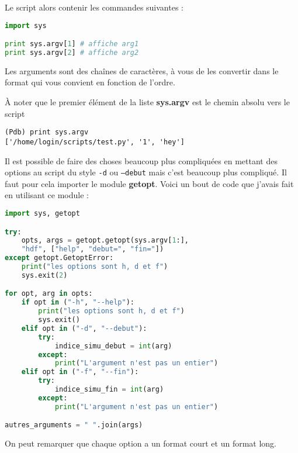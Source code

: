 \documentclass[a4paper,twoside]{article}
\begin{document}
Le script alors contenir les commandes suivantes :
\begin{lstlisting}[language=python]
import sys

print sys.argv[1] # affiche arg1
print sys.argv[2] # affiche arg2
\end{lstlisting}
Les arguments sont des chaînes de caractères, à vous de les convertir dans le format qui vous convient en fonction de l'ordre.

\begin{remarque}
À noter que le premier élément de la liste \textbf{sys.argv} est le chemin absolu vers le script
\begin{verbatim}
(Pdb) print sys.argv
['/home/login/scripts/test.py', '1', 'hey']
\end{verbatim}
\end{remarque}

\bigskip

Il est possible de faire des choses beaucoup plus compliquées en mettant des options au script du style \texttt{-d} ou \texttt{--debut} mais c'est beaucoup plus compliqué. Il faut pour cela importer le module \textbf{getopt}. Voici un bout de code que j'avais fait en utilisant ce module : 
\begin{lstlisting}[language=python]
import sys, getopt

try:                                
    opts, args = getopt.getopt(sys.argv[1:], 
    "hdf", ["help", "debut=", "fin="])
except getopt.GetoptError:          
    print("les options sont h, d et f")                        
    sys.exit(2)

for opt, arg in opts:                
    if opt in ("-h", "--help"):      
        print("les options sont h, d et f")                    
        sys.exit()                  
    elif opt in ("-d", "--debut"):
        try:
            indice_simu_debut = int(arg)
        except:
            print("L'argument n'est pas un entier")
    elif opt in ("-f", "--fin"): 
        try:
            indice_simu_fin = int(arg)
        except:
            print("L'argument n'est pas un entier")

autres_arguments = " ".join(args)
\end{lstlisting}
On peut remarquer que chaque option a un format court et un format long.

\printindex
\end{document}
